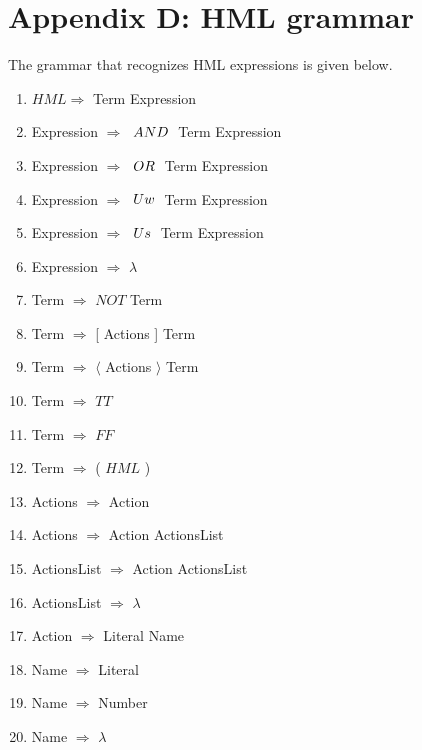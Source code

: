 \section*{Appendix D: HML grammar}
The grammar that recognizes HML expressions is given below.

\begin{enumerate}
\item $HML \Rightarrow$ Term Expression
\item Expression $\Rightarrow$ $\hspace{1 mm} AND \hspace{1 mm} $ Term Expression
\item Expression $\Rightarrow$ $\hspace{1 mm} OR \hspace{1 mm} $ Term Expression
\item Expression $\Rightarrow$ $\hspace{1 mm} Uw \hspace{1 mm} $ Term Expression
\item Expression $\Rightarrow$ $\hspace{1 mm} Us \hspace{1 mm} $ Term Expression
\item Expression $\Rightarrow$ $\lambda$
\item Term $\Rightarrow$ $NOT$ Term
\item Term $\Rightarrow$ [ Actions ] Term
\item Term $\Rightarrow$ $\langle$ Actions $\rangle$ Term
\item Term $\Rightarrow$ $TT$
\item Term $\Rightarrow$ $FF$
\item Term $\Rightarrow$ ( $HML$ )
\item Actions $\Rightarrow$ Action
\item Actions $\Rightarrow$ { Action ActionsList }
\item ActionsList $\Rightarrow$ Action ActionsList
\item ActionsList $\Rightarrow$ $\lambda$
\item Action $\Rightarrow$ Literal Name
\item Name $\Rightarrow$ Literal
\item Name $\Rightarrow$ Number
\item Name $\Rightarrow$ $\lambda$

\end{enumerate}
